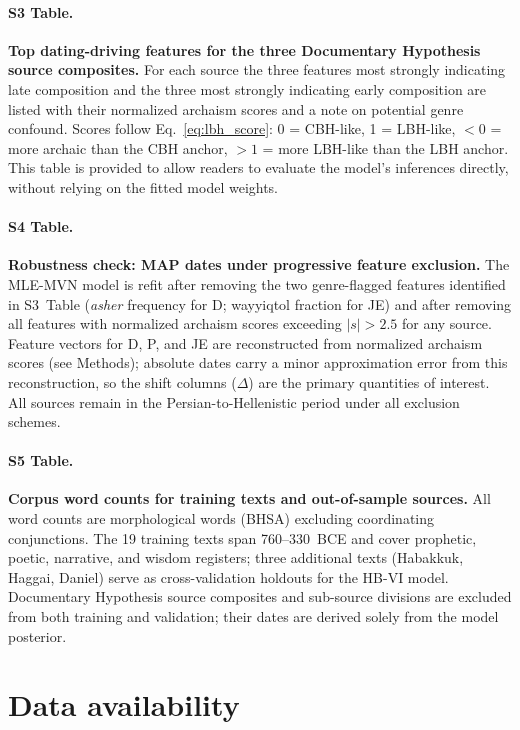 \documentclass[10pt,letterpaper]{article}
\begin{document}
\paragraph*{S3 Table.}
\label{S3_Table}
\textbf{Top dating-driving features for the three Documentary Hypothesis source composites.}
For each source the three features most strongly indicating late composition and the three most
strongly indicating early composition are listed with their normalized archaism scores and a
note on potential genre confound.  Scores follow Eq.~\ref{eq:lbh_score}: 0 = CBH-like, 1
= LBH-like, $<0$ = more archaic than the CBH anchor, $>1$ = more LBH-like than the LBH
anchor.  This table is provided to allow readers to evaluate the model's inferences directly,
without relying on the fitted model weights.

\paragraph*{S4 Table.}
\label{S4_Table}
\textbf{Robustness check: MAP dates under progressive feature exclusion.}
The MLE-MVN model is refit after removing the two genre-flagged features identified in
S3~Table (\textit{asher} frequency for D; wayyiqtol fraction for JE) and after removing
all features with normalized archaism scores exceeding $|s|>2.5$ for any source.  Feature
vectors for D, P, and JE are reconstructed from normalized archaism scores (see Methods);
absolute dates carry a minor approximation error from this reconstruction, so the shift
columns ($\Delta$) are the primary quantities of interest.  All sources remain in the
Persian-to-Hellenistic period under all exclusion schemes.

\paragraph*{S5 Table.}
\label{S5_Table}
\textbf{Corpus word counts for training texts and out-of-sample sources.}
All word counts are morphological words (BHSA) excluding coordinating conjunctions.
The 19 training texts span 760--330~BCE and cover prophetic, poetic, narrative, and
wisdom registers; three additional texts (Habakkuk, Haggai, Daniel) serve as
cross-validation holdouts for the HB-VI model.  Documentary Hypothesis source composites
and sub-source divisions are excluded from both training and validation; their dates are
derived solely from the model posterior.

\section*{Data availability}
\end{document}
